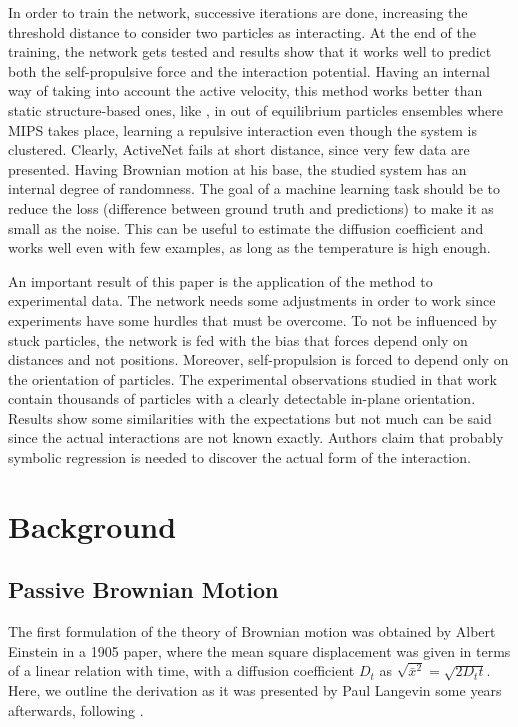 \documentclass[../../master_thesis_np.tex]{subfiles}
\begin{document}
	In order to train the network, successive iterations are done, increasing the threshold distance to consider two particles as interacting. 
	At the end of the training, the network gets tested and results show that it works well to predict both the self-propulsive force and the interaction potential. 
	Having an internal way of taking into account the active velocity, this method works better than static structure-based ones, like \cite{bag_interaction_2021}, in out of equilibrium particles ensembles where MIPS takes place, learning a repulsive interaction even though the system is clustered. 
	Clearly, ActiveNet fails at short distance, since very few data are presented. 
	Having Brownian motion at his base, the studied system has an internal degree of randomness. 
	The goal of a machine learning task should be to reduce the loss (difference between ground truth and predictions) to make it as small as the noise. 
	This can be useful to estimate the diffusion coefficient and works well even with few examples, as long as the temperature is high enough. 
	
	An important result of this paper is the application of the method to experimental data. 
	The network needs some adjustments in order to work since experiments have some hurdles that must be overcome. 
	To not be influenced by stuck particles, the network is fed with the bias that forces depend only on distances and not positions. 
	Moreover, self-propulsion is forced to depend only on the orientation of particles. 
	The experimental observations studied in that work contain thousands of particles with a clearly detectable in-plane orientation. 
	Results show some similarities with the expectations but not much can be said since the actual interactions are not known exactly. 
	Authors claim that probably symbolic regression is needed to discover the actual form of the interaction.
	
	\section{Background}
	\subsection{Passive Brownian Motion}

	The first formulation of the theory of Brownian motion was obtained by Albert Einstein in a 1905 paper, where the mean square displacement was given in terms of a linear relation with time, with a diffusion coefficient $D_t$ as $\sqrt{\bar{x}^2} = \sqrt{2D_t t}$. 
	Here, we outline the derivation as it was presented by Paul Langevin some years afterwards, following \cite{gardiner_handbook_2004}.
	
\end{document}
